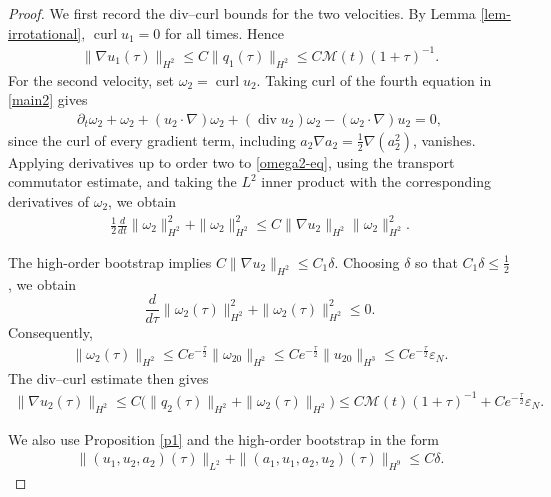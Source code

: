 \documentclass[10pt,reqno]{amsart}
\numberwithin{equation}{section}
\begin{document}
\begin{proof} We first record the div--curl bounds for the two velocities.  By Lemma \ref{lem-irrotational},
$\operatorname{curl}u_1=0$ for all times.  Hence
\begin{align}\label{u1-from-q1}
\|\nabla u_1(\tau)\|_{H^2}
\le C\|q_1(\tau)\|_{H^2}
\le C\mathcal M(t)(1+\tau)^{-1}.
\end{align}
For the second velocity, set $\omega_2=\operatorname{curl}u_2$.  Taking curl of the fourth equation in \eqref{main2} gives
\begin{align}\label{omega2-eq}
\partial_t\omega_2+\omega_2
+(u_2\cdot\nabla)\omega_2
+(\operatorname{div}u_2)\omega_2
-(\omega_2\cdot\nabla)u_2=0,
\end{align}
since the curl of every gradient term, including $a_2\nabla a_2=\frac12\nabla(a_2^2)$, vanishes.  Applying derivatives up to order two to \eqref{omega2-eq}, using the transport commutator estimate, and taking the $L^2$ inner product with the corresponding derivatives of $\omega_2$, we obtain
\begin{align*}
\frac12\frac{d}{dt}\|\omega_2\|_{H^2}^2+\|\omega_2\|_{H^2}^2
\le C\|\nabla u_2\|_{H^2}\|\omega_2\|_{H^2}^2.
\end{align*}

The high-order bootstrap implies $C\|\nabla u_2\|_{H^2}\le C_1\delta$.
Choosing $\delta$ so that $C_1\delta\le\frac12$, we obtain
\[
\frac{d}{d\tau}\|\omega_2(\tau)\|_{H^2}^2
+\|\omega_2(\tau)\|_{H^2}^2\le0.
\]
Consequently, 
\begin{align}\label{omega2-decay}
\|\omega_2(\tau)\|_{H^2}
\le Ce^{-\frac{\tau}{2}}\|\omega_{20}\|_{H^2}
\le  Ce^{-\frac{\tau}{2}}\|u_{20}\|_{H^3}\le Ce^{-\frac{\tau}{2}}\varepsilon_N.
\end{align}
The div--curl estimate then gives
\begin{align}\label{u2-from-q2}
\|\nabla u_2(\tau)\|_{H^2}
\le C\big(\|q_2(\tau)\|_{H^2}+\|\omega_2(\tau)\|_{H^2}\big)
\le C\mathcal M(t)(1+\tau)^{-1}
+Ce^{-\frac{\tau}{2}}\varepsilon_N.
\end{align}

We also use Proposition \ref{p1} and the high-order bootstrap in the form
\begin{align}\label{uniform-L2-source}
\|(u_1,u_2,a_2)(\tau)\|_{L^2}
+\|(a_1,u_1,a_2,u_2)(\tau)\|_{H^9}
\le C\delta.
\end{align}


\end{proof}
\end{document}

